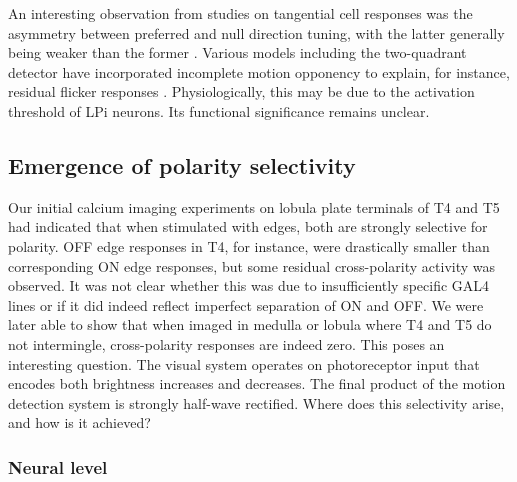 An interesting observation from studies on tangential cell responses was the asymmetry between preferred and null direction tuning, with the latter generally being weaker than the former \citep{Egelhaaf:1989wf,Joesch:2008fo}. Various models including the two-quadrant detector have incorporated incomplete motion opponency to explain, for instance, residual flicker responses \citep{Eichner:2011ic}. Physiologically, this may be due to the activation threshold of LPi neurons. Its functional significance remains unclear.


\subsection{Emergence of polarity selectivity}
Our initial calcium imaging experiments on lobula plate terminals of T4 and T5 had indicated that when stimulated with edges, both are strongly selective for polarity. OFF edge responses in T4, for instance, were drastically smaller than corresponding ON edge responses, but some residual cross-polarity activity was observed. It was not clear whether this was due to insufficiently specific GAL4 lines or if it did indeed reflect imperfect separation of ON and OFF. We were later able to show that when imaged in medulla or lobula where T4 and T5 do not intermingle, cross-polarity responses are indeed zero. This poses an interesting question. The visual system operates on photoreceptor input that encodes both brightness increases and decreases. The final product of the motion detection system is strongly half-wave rectified. Where does this selectivity arise, and how is it achieved?

\subsubsection{Neural level}

